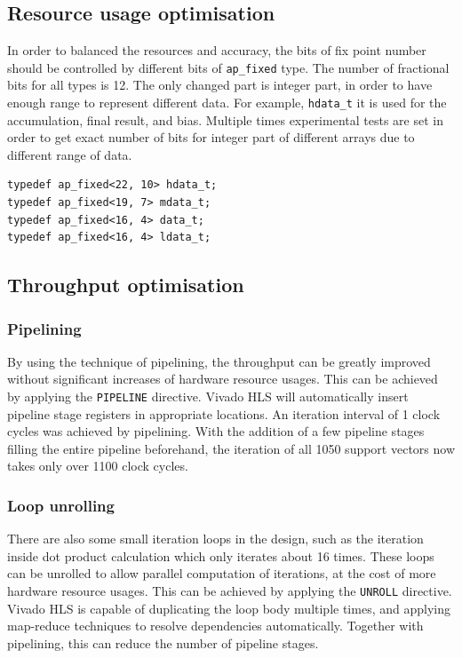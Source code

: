 \documentclass[journal]{IEEEtran}
\begin{document}
\subsection{Resource usage optimisation}
In order to balanced the resources and accuracy, the bits of fix point number should be controlled by different bits of \texttt{ap\_fixed} type. The number of fractional bits for all types is 12. The only changed part is integer part, in order to have enough range to represent different data. For example, \texttt{hdata\_t} it is used for the accumulation, final result, and bias. Multiple times experimental tests are set in order to get exact number of bits for integer part of different arrays due to different range of data.
\begin{lstlisting}[caption={Optimised data type},captionpos=b,label=lst:data_t]
typedef ap_fixed<22, 10> hdata_t;
typedef ap_fixed<19, 7> mdata_t;
typedef ap_fixed<16, 4> data_t;
typedef ap_fixed<16, 4> ldata_t;
\end{lstlisting}

\subsection{Throughput optimisation}

\subsubsection{Pipelining}

By using the technique of pipelining, the throughput can be greatly improved without significant increases of hardware resource usages. This can be achieved by applying the \texttt{PIPELINE} directive. Vivado HLS will automatically insert pipeline stage registers in appropriate locations. An iteration interval of 1 clock cycles was achieved by pipelining. With the addition of a few pipeline stages filling the entire pipeline beforehand, the iteration of all 1050 support vectors now takes only over 1100 clock cycles.

\subsubsection{Loop unrolling}

There are also some small iteration loops in the design, such as the iteration inside dot product calculation which only iterates about 16 times. These loops can be unrolled to allow parallel computation of iterations, at the cost of more hardware resource usages. This can be achieved by applying the \texttt{UNROLL} directive. Vivado HLS is capable of duplicating the loop body multiple times, and applying map-reduce techniques to resolve dependencies automatically. Together with pipelining, this can reduce the number of pipeline stages.
\end{document}
